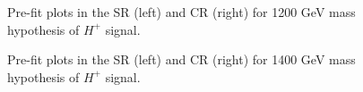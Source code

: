 \begin{figure}[H]
  \centering
  \caption{Pre-fit plots in the SR (left) and CR (right) for 1200 GeV mass hypothesis of $H^{+}$ signal.}
  \label{fig:Prefit_Hp1200_Asimov}
\end{figure}
\begin{figure}[H]
  \centering
  \caption{Pre-fit plots in the SR (left) and CR (right) for 1400 GeV mass hypothesis of $H^{+}$ signal.}
  \label{fig:Prefit_Hp1400_Asimov}
\end{figure}
